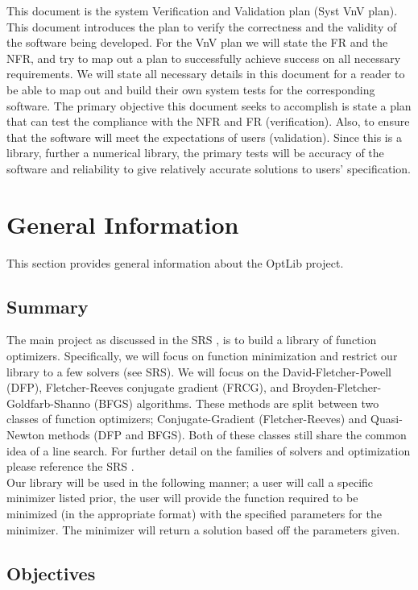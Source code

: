 \documentclass[12pt, titlepage]{article}
\begin{document}
This document is the system Verification and Validation plan (Syst VnV plan). This document introduces
the plan to verify the correctness and the validity of the software being developed.  For the VnV plan we
will state the FR and the NFR, and try to map out a plan to successfully achieve success on all necessary 
requirements. We will state all necessary details in this document for a reader to be able to map out and 
build their own system tests for the corresponding software. The primary objective this document seeks to
accomplish is state a plan that can test the compliance with the NFR and FR (verification). Also, to ensure 
that the software will meet the expectations of users (validation). Since this is a library, further a 
numerical library, the primary tests will be accuracy of the software and reliability to give relatively 
accurate solutions to users' specification. 


\section{General Information}
This section provides general information about the OptLib project.

\subsection{Summary}
The main project as discussed in the SRS \citep{SRS}, is to build a library of function optimizers. Specifically, we will
focus on function minimization and restrict our library to a few solvers (see SRS). We will focus on the 
David-Fletcher-Powell (DFP), Fletcher-Reeves conjugate gradient (FRCG), and Broyden-Fletcher-Goldfarb-Shanno (BFGS) algorithms. 
These methods are split between two classes of function optimizers; Conjugate-Gradient (Fletcher-Reeves) and Quasi-Newton 
methods (DFP and BFGS). Both of these classes still share the common idea of a line search. For further detail on the families
of solvers and optimization please reference the SRS \citep{SRS}.
\\

Our library will be used in the following manner; a user will call a specific minimizer listed prior, the user will provide the 
function required to be minimized (in the appropriate format) with the specified parameters for the minimizer. The minimizer will
return a solution based off the parameters given. 

\subsection{Objectives}
\end{document}
